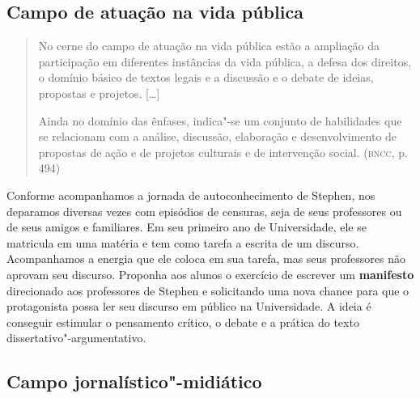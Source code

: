 \documentclass[12pt]{extarticle}
\begin{document}
\subsection{Campo de atuação na vida pública}

\begin{quote}
No cerne do campo de atuação na vida pública estão a ampliação da
participação em diferentes instâncias da vida pública, a defesa dos
direitos, o domínio básico de textos legais e a discussão e o debate de
ideias, propostas e projetos. {[}\ldots{}{]}

Ainda no domínio das ênfases, indica"-se um conjunto de habilidades que
se relacionam com a análise, discussão, elaboração e desenvolvimento de
propostas de ação e de projetos culturais e de intervenção social.
(\textsc{bncc}, p. 494)
\end{quote}

Conforme acompanhamos a jornada de autoconhecimento de Stephen, nos
deparamos diversas vezes com episódios de censuras, seja de seus
professores ou de seus amigos e familiares. Em seu primeiro ano de
Universidade, ele se matricula em uma matéria e tem como tarefa a
escrita de um discurso. Acompanhamos a energia que ele coloca em sua
tarefa, mas seus professores não aprovam seu discurso. Proponha aos
alunos o exercício de escrever um \textbf{manifesto} direcionado aos
professores de Stephen e solicitando uma nova chance para que o
protagonista possa ler seu discurso em público na Universidade. A
ideia é conseguir estimular o pensamento crítico, o debate e a prática
do texto dissertativo"-argumentativo.

\subsection{Campo jornalístico"-midiático}
\end{document}
